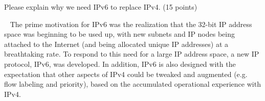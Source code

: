 \begin{exercise}[]{Please explain why we need IPv6 to replace IPv4. (15 points)}
  \begin{solution}
  \par{~} 
  The prime motivation for IPv6 was the realization that the 32-bit IP address space was beginning to be used up, with new subnets and IP nodes being attached to the Internet (and being allocated unique IP addresses) at a breathtaking rate. To respond to this need for a large IP address space, a new IP protocol, IPv6, was developed. In addition, IPv6 is also designed with the expectation that other aspects of IPv4 could be tweaked and augmented (e.g. flow labeling and priority), based on the accumulated operational experience with IPv4.
  \end{solution}
  \label{ex7}
\end{exercise}


